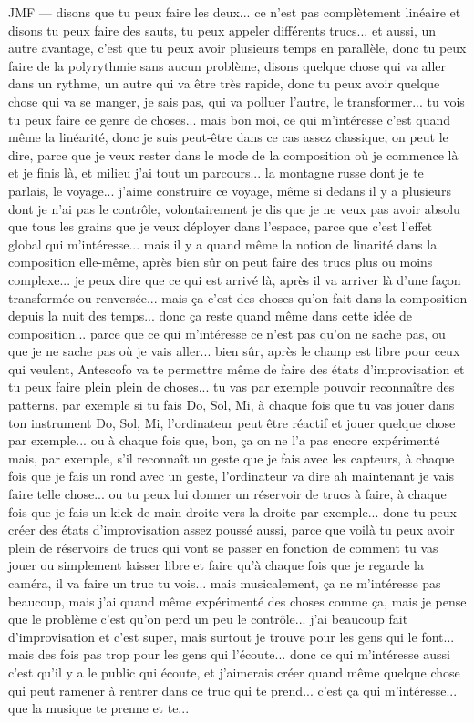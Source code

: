 JMF — disons que tu peux faire les deux... ce n'est pas complètement linéaire et disons tu peux faire des sauts, tu peux appeler différents trucs... et aussi, un autre avantage, c'est que tu peux avoir plusieurs temps en parallèle, donc tu peux faire de la polyrythmie sans aucun problème, disons quelque chose qui va aller dans un rythme, un autre qui va être très rapide, donc tu peux avoir quelque chose qui va se manger, je sais pas, qui va polluer l'autre, le transformer... tu vois tu peux faire ce genre de choses... mais bon moi, ce qui m'intéresse c'est quand même la linéarité, donc je suis peut-être dans ce cas assez classique, on peut le dire, parce que je veux rester dans le mode de la composition où je commence là et je finis là, et milieu j'ai tout un parcours... la montagne russe dont je te parlais, le voyage... j'aime construire ce voyage, même si dedans il y a plusieurs dont je n'ai pas le contrôle, volontairement je dis que je ne veux pas avoir absolu que tous les grains que je veux déployer dans l'espace, parce que c'est l'effet global qui m'intéresse... mais il y a quand même la notion de linarité dans la composition elle-même, après bien sûr on peut faire des trucs plus ou moins complexe... je peux dire que ce qui est arrivé là, après il va arriver là d'une façon transformée ou renversée... mais ça c'est des choses qu'on fait dans la composition depuis la nuit des temps... donc ça reste quand même dans cette idée de composition... parce que ce qui m'intéresse ce n'est pas qu'on ne sache pas, ou que je ne sache pas où je vais aller... bien sûr, après le champ est libre pour ceux qui veulent, Antescofo va te permettre même de faire des états d'improvisation et tu peux faire plein plein de choses... tu vas par exemple pouvoir reconnaître des patterns, par exemple si tu fais Do, Sol, Mi, à chaque fois que tu vas jouer dans ton instrument Do, Sol, Mi, l'ordinateur peut être réactif et jouer quelque chose par exemple... ou à chaque fois que, bon, ça on ne l'a pas encore expérimenté mais, par exemple, s'il reconnaît un geste que je fais avec les capteurs, à chaque fois que je fais un rond avec un geste, l'ordinateur va dire ah maintenant je vais faire telle chose... ou tu peux lui donner un réservoir de trucs à faire, à chaque fois que je fais un kick de main droite vers la droite par exemple... donc tu peux créer des états d'improvisation assez poussé aussi, parce que voilà tu peux avoir plein de réservoirs de trucs qui vont se passer en fonction de comment tu vas jouer ou simplement laisser libre et faire qu'à chaque fois que je regarde la caméra, il va faire un truc tu vois... mais musicalement, ça ne m'intéresse pas beaucoup, mais j'ai quand même expérimenté des choses comme ça, mais je pense que le problème c'est qu'on perd un peu le contrôle... j'ai beaucoup fait d'improvisation et c'est super, mais surtout je trouve pour les gens qui le font... mais des fois pas trop pour les gens qui l'écoute... donc ce qui m'intéresse aussi c'est qu'il y a le public qui écoute, et j'aimerais créer quand même quelque chose qui peut ramener à rentrer dans ce truc qui te prend... c'est ça qui m'intéresse... que la musique te prenne et te... 


